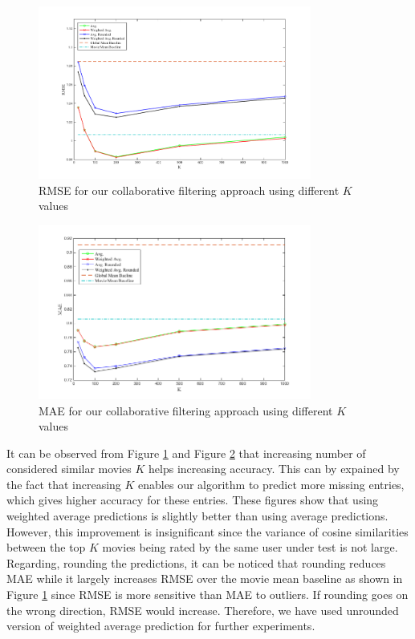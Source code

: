 \begin{figure}[!ht]
  \centering \includegraphics[width=0.8\textwidth]{images/rmse.png}
  \caption{RMSE for our collaborative filtering approach using
    different $K$ values}
  \label{fig:rmse}
\end{figure}

\begin{figure}[!ht]
  \centering \includegraphics[width=0.8\textwidth]{images/MAE.png}
  \caption{MAE for our collaborative filtering approach using
    different $K$ values}
  \label{fig:mae}
\end{figure}

It can be observed from Figure \ref{fig:rmse} and Figure \ref{fig:mae}
that increasing number of considered similar movies $K$ helps
increasing accuracy. This can by expained by the fact that increasing
$K$ enables our algorithm to predict more missing entries, which gives
higher accuracy for these entries. These figures show that using
weighted average predictions is slightly better than using average
predictions. However, this improvement is insignificant since the
variance of cosine similarities between the top $K$ movies being rated
by the same user under test is not large. Regarding, rounding the
predictions, it can be noticed that rounding reduces MAE while it
largely increases RMSE over the movie mean baseline as shown in Figure
\ref{fig:rmse} since RMSE is more sensitive than MAE to outliers. If
rounding goes on the wrong direction, RMSE would increase. Therefore,
we have used unrounded version of weighted average prediction for
further experiments.


